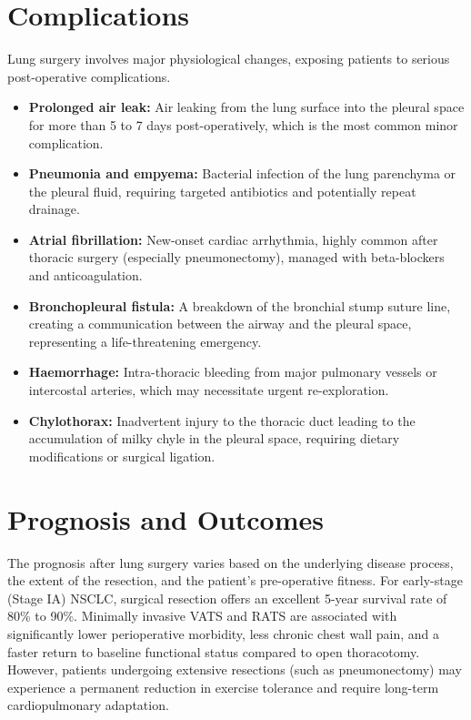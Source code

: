 \section*{Complications}
Lung surgery involves major physiological changes, exposing patients to serious post-operative complications.
\begin{itemize}
    \item \textbf{Prolonged air leak:} Air leaking from the lung surface into the pleural space for more than 5 to 7 days post-operatively, which is the most common minor complication.
    \item \textbf{Pneumonia and empyema:} Bacterial infection of the lung parenchyma or the pleural fluid, requiring targeted antibiotics and potentially repeat drainage.
    \item \textbf{Atrial fibrillation:} New-onset cardiac arrhythmia, highly common after thoracic surgery (especially pneumonectomy), managed with beta-blockers and anticoagulation.
    \item \textbf{Bronchopleural fistula:} A breakdown of the bronchial stump suture line, creating a communication between the airway and the pleural space, representing a life-threatening emergency.
    \item \textbf{Haemorrhage:} Intra-thoracic bleeding from major pulmonary vessels or intercostal arteries, which may necessitate urgent re-exploration.
    \item \textbf{Chylothorax:} Inadvertent injury to the thoracic duct leading to the accumulation of milky chyle in the pleural space, requiring dietary modifications or surgical ligation.
\end{itemize}

\section*{Prognosis and Outcomes}
The prognosis after lung surgery varies based on the underlying disease process, the extent of the resection, and the patient's pre-operative fitness. For early-stage (Stage IA) NSCLC, surgical resection offers an excellent 5-year survival rate of 80\% to 90\%. Minimally invasive VATS and RATS are associated with significantly lower perioperative morbidity, less chronic chest wall pain, and a faster return to baseline functional status compared to open thoracotomy. However, patients undergoing extensive resections (such as pneumonectomy) may experience a permanent reduction in exercise tolerance and require long-term cardiopulmonary adaptation.


